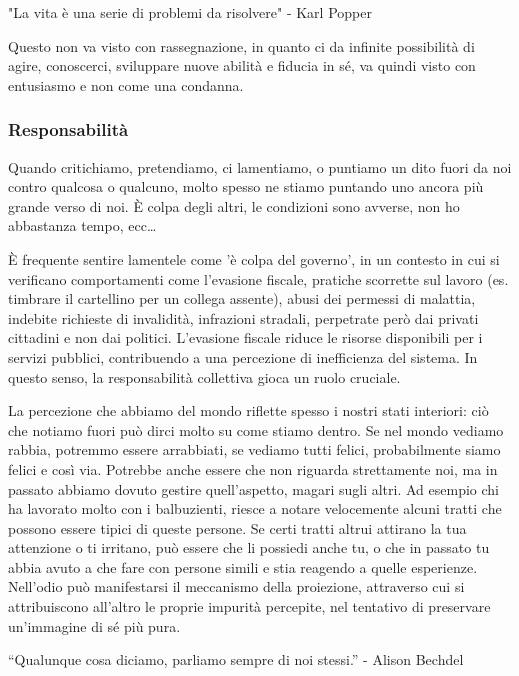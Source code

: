 \documentclass[12pt]{book} %
\begin{document}
"La vita è una serie di problemi da risolvere" - Karl Popper 

Questo non va visto con rassegnazione, in quanto ci da infinite possibilità di agire, conoscerci, sviluppare nuove abilità e fiducia in sé, va quindi visto con entusiasmo e non come una condanna.

\subsubsection{Responsabilità}
Quando critichiamo, pretendiamo, ci
lamentiamo, o puntiamo un dito fuori da noi contro qualcosa o qualcuno, molto spesso ne stiamo puntando uno
ancora più grande verso di noi. È colpa degli altri, le condizioni sono avverse, non ho abbastanza tempo, ecc… 

È frequente sentire lamentele come 'è colpa del governo', in un contesto in cui si verificano comportamenti come l'evasione fiscale, pratiche scorrette sul lavoro (es. timbrare il cartellino per un collega assente), abusi dei permessi di malattia, indebite richieste di invalidità, infrazioni stradali, perpetrate però dai privati cittadini e non dai politici. L’evasione fiscale riduce le risorse disponibili per i servizi pubblici, contribuendo a una percezione di inefficienza del sistema. In questo senso, la responsabilità collettiva gioca un ruolo cruciale.

La percezione che abbiamo del mondo riflette spesso i nostri stati interiori: ciò che notiamo fuori può dirci molto su come stiamo dentro. Se nel mondo vediamo rabbia, potremmo essere arrabbiati, se vediamo tutti felici, probabilmente siamo felici e così via. Potrebbe anche essere che non riguarda strettamente noi, ma in passato abbiamo dovuto gestire quell'aspetto, magari sugli altri. Ad esempio chi ha lavorato molto con i balbuzienti, riesce a notare velocemente alcuni tratti che possono essere tipici di queste persone. Se certi tratti altrui attirano la tua attenzione o ti irritano, può essere che li possiedi anche tu, o che in passato tu abbia avuto a che fare con persone simili e stia reagendo a quelle esperienze.
Nell'odio può manifestarsi il meccanismo della proiezione, attraverso cui si attribuiscono all'altro le proprie impurità percepite, nel tentativo di preservare un'immagine di sé più pura.

“Qualunque cosa diciamo, parliamo sempre di noi stessi.” - Alison Bechdel
\end{document}
